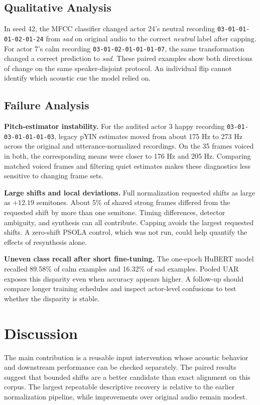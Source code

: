 \documentclass[11pt, letterpaper]{article}
\begin{document}
\subsection{Qualitative Analysis}
In seed 42, the MFCC classifier changed actor 24's neutral recording
\texttt{03-01-01-01-02-01-24} from \emph{sad} on original audio to the correct
\emph{neutral} label after capping. For actor 7's calm recording
\texttt{03-01-02-01-01-01-07}, the same transformation changed a correct prediction to \emph{sad}. These paired examples show both directions of change on the same speaker-disjoint protocol. An individual flip cannot identify which acoustic cue the model relied on.

\subsection{Failure Analysis}
\textbf{Pitch-estimator instability.} For the audited actor 3 happy recording
\texttt{03-01-03-01-01-01-03}, legacy pYIN estimates moved from about 175 Hz to 273 Hz across the original and utterance-normalized recordings. On the 35 frames voiced in both, the corresponding means were closer to 176 Hz and 205 Hz. Comparing matched voiced frames and filtering quiet estimates makes these diagnostics less sensitive to changing frame sets.

\textbf{Large shifts and local deviations.} Full normalization requested shifts as large as $+12.19$ semitones. About 5\% of shared strong frames differed from the requested shift by more than one semitone. Timing differences, detector ambiguity, and synthesis can all contribute. Capping avoids the largest requested shifts. A zero-shift PSOLA control, which was not run, could help quantify the effects of resynthesis alone.

\textbf{Uneven class recall after short fine-tuning.} The one-epoch HuBERT model recalled 89.58\% of calm examples and 16.32\% of sad examples. Pooled UAR exposes this disparity even when accuracy appears higher. A follow-up should compare longer training schedules and inspect actor-level confusions to test whether the disparity is stable.

\clearpage
\section{Discussion}
The main contribution is a reusable input intervention whose acoustic behavior and downstream performance can be checked separately. The paired results suggest that bounded shifts are a better candidate than exact alignment on this corpus. The largest repeatable descriptive recovery is relative to the earlier normalization pipeline, while improvements over original audio remain modest.
\end{document}
